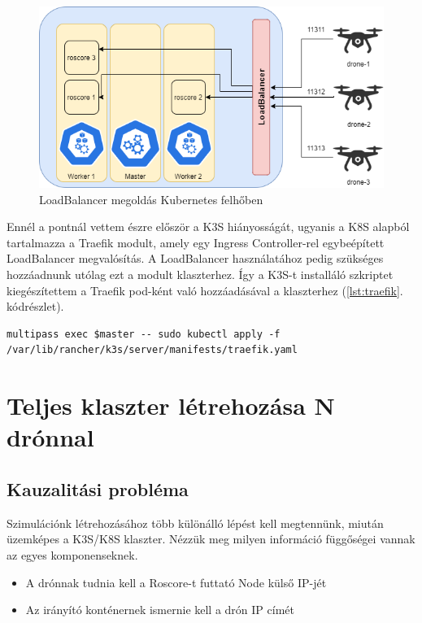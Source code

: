 \begin{figure}
	\centering
	\includegraphics[width=\linewidth]{figures/loadBalancer.png}
	\caption{LoadBalancer megoldás Kubernetes felhőben}
	\label{fig:loadbalancer}
\end{figure}

\noindent
Ennél a pontnál vettem észre először a K3S hiányosságát, ugyanis a K8S alapból tartalmazza a Traefik modult, amely egy Ingress Controller-rel egybeépített LoadBalancer megvalósítás. A LoadBalancer használatához pedig szükséges hozzáadnunk utólag ezt a modult klaszterhez. Így a K3S-t installáló szkriptet kiegészítettem a Traefik pod-ként való hozzáadásával a klaszterhez (\ref{lst:traefik}. kódrészlet).

\begin{lstlisting}[caption={Traefik hozzáadása a klaszterhez}, label={lst:traefik}]
multipass exec $master -- sudo kubectl apply -f /var/lib/rancher/k3s/server/manifests/traefik.yaml
\end{lstlisting}

\section{Teljes klaszter létrehozása N drónnal}

\subsection{Kauzalitási probléma}
Szimulációnk létrehozásához több különálló lépést kell megtennünk, miután üzemképes a K3S/K8S klaszter. Nézzük meg milyen információ függőségei vannak az egyes komponenseknek.
\begin{itemize}
	\item A drónnak tudnia kell a Roscore-t futtató Node külső IP-jét
	\item Az irányító konténernek ismernie kell a drón IP címét
\end{itemize}

